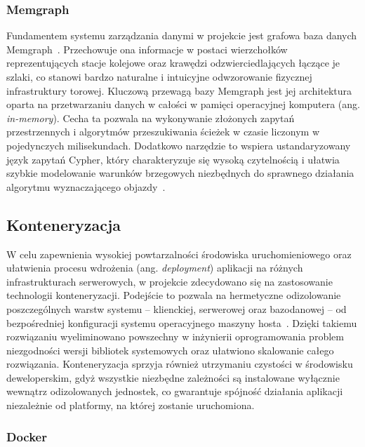 \documentclass[twoside]{projektInzynierskiMS1z}
\begin{document}
\subsubsection{Memgraph}

Fundamentem systemu zarządzania danymi w projekcie jest grafowa baza danych
Memgraph~\cite{memgraph}. Przechowuje ona informacje w postaci wierzchołków
reprezentujących stacje kolejowe oraz krawędzi odzwierciedlających łączące je szlaki,
co stanowi bardzo naturalne i intuicyjne odwzorowanie fizycznej infrastruktury torowej.
Kluczową przewagą bazy Memgraph jest jej architektura oparta na przetwarzaniu danych
w całości w pamięci operacyjnej komputera (ang. \emph{in-memory}). Cecha ta pozwala na
wykonywanie złożonych zapytań przestrzennych i algorytmów przeszukiwania ścieżek
w czasie liczonym w pojedynczych milisekundach. Dodatkowo narzędzie to wspiera
ustandaryzowany język zapytań Cypher, który charakteryzuje się wysoką czytelnością
i ułatwia szybkie modelowanie warunków brzegowych niezbędnych do sprawnego działania
algorytmu wyznaczającego objazdy~\cite{cypher}.

\subsection{Konteneryzacja}

W celu zapewnienia wysokiej powtarzalności środowiska uruchomieniowego oraz ułatwienia
procesu wdrożenia (ang. \emph{deployment}) aplikacji na różnych infrastrukturach
serwerowych, w projekcie zdecydowano się na zastosowanie technologii konteneryzacji.
Podejście to pozwala na hermetyczne odizolowanie poszczególnych warstw systemu --
klienckiej, serwerowej oraz bazodanowej -- od bezpośredniej konfiguracji systemu
operacyjnego maszyny hosta~\cite{docker}. Dzięki takiemu rozwiązaniu wyeliminowano
powszechny w inżynierii oprogramowania problem niezgodności wersji bibliotek systemowych
oraz ułatwiono skalowanie całego rozwiązania. Konteneryzacja sprzyja również utrzymaniu
czystości w środowisku deweloperskim, gdyż wszystkie niezbędne zależności są instalowane
wyłącznie wewnątrz odizolowanych jednostek, co gwarantuje spójność działania aplikacji
niezależnie od platformy, na której zostanie uruchomiona.

\subsubsection{Docker}
\end{document}
